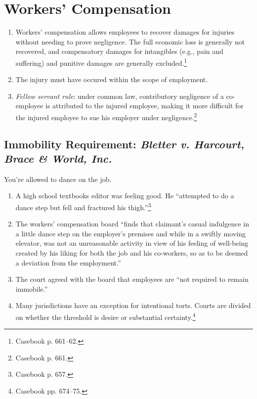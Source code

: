 \section{Workers' Compensation}

\begin{enumerate}
    \item Workers' compensation allows employees to recover damages for 
    injuries without needing to prove negligence. The full economic loss is 
    generally not recovered, and compensatory damages for intangibles (e.g., 
    pain and suffering) and punitive damages are generally 
    excluded.\footnote{Casebook p. 661--62.}
    \item The injury must have occured within the scope of employment.
    \item \emph{Fellow servant rule}: under common law, contributory 
    negligence of a co-employee is attributed to the injured employee, making 
    it more difficult for the injured employee to sue his employer under 
    negligence.\footnote{Casebook p. 661.}
\end{enumerate}

\subsection{Immobility Requirement: \emph{Bletter v. Harcourt, Brace \& World, 
Inc.}}

You're allowed to dance on the job.

\begin{enumerate}
    \item A high school textbooks editor was feeling good. He ``attempted to 
    do a dance step but fell and fractured his thigh.''\footnote{Casebook p.  
    657.}
    \item The workers' compensation board ``finds that claimant's casual 
    indulgence in a little dance step on the employer's premises and while in 
    a swiftly moving elevator, was not an unreasonable activity in view of his 
    feeling of well-being created by his liking for both the job and his 
    co-workers, so as to be deemed a deviation from the employment.''
    \item The court agreed with the board that employees are ``not required to 
    remain immobile.''
    \item Many jurisdictions have an exception for intentional torts. Courts 
    are divided on whether the threshold is desire or substantial 
    certainty.\footnote{Casebook pp. 674--75.}
\end{enumerate}

